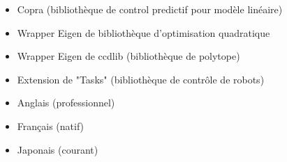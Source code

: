 








\divider

\divider

\divider

\divider

\divider

\divider

\divider



\begin{itemize}[leftmargin=7mm]
    \item Copra (bibliothèque de control predictif pour modèle linéaire)
    \item Wrapper Eigen de bibliothèque d'optimisation quadratique
    \item Wrapper Eigen de ccdlib (bibliothèque de polytope)
    \item Extension de "Tasks" (bibliothèque de contrôle de robots)
\end{itemize}


\begin{itemize}[leftmargin=7mm]
    \item Anglais (professionnel)
    \item Français (natif)
    \item Japonais (courant)
\end{itemize}


